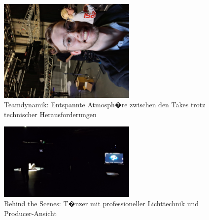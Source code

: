 
\begin{figure}[!htbp]
   \centering
   \includegraphics[width=0.6\textwidth,height=0.25\textheight,keepaspectratio]{images/onSetImages/MartySmileyIntoCameraOnSet.jpg}
   \caption{Teamdynamik: Entspannte Atmosph�re zwischen den Takes trotz technischer Herausforderungen}
   \label{fig:team_atmosphere}
\end{figure}

\begin{figure}[!htbp]
   \centering
   \includegraphics[width=0.6\textwidth,height=0.25\textheight,keepaspectratio]{images/BTS_TopDown_DancerAndProducer.png}
   \caption{Behind the Scenes: T�nzer mit professioneller Lichttechnik und Producer-Ansicht}
   \label{fig:studio_wide}
\end{figure}



